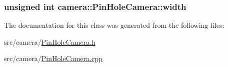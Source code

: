 \subsubsection[{\texorpdfstring{width}{width}}]{\setlength{\rightskip}{0pt plus 5cm}unsigned int camera\+::\+Pin\+Hole\+Camera\+::width\hspace{0.3cm}{\ttfamily [private]}}\hypertarget{classcamera_1_1PinHoleCamera_a84af11864219ddf7d2e3ddb0a7888d56}{}\label{classcamera_1_1PinHoleCamera_a84af11864219ddf7d2e3ddb0a7888d56}


The documentation for this class was generated from the following files\+:\begin{DoxyCompactItemize}
\item 
src/camera/\hyperlink{PinHoleCamera_8h}{Pin\+Hole\+Camera.\+h}\item 
src/camera/\hyperlink{PinHoleCamera_8cpp}{Pin\+Hole\+Camera.\+cpp}\end{DoxyCompactItemize}
